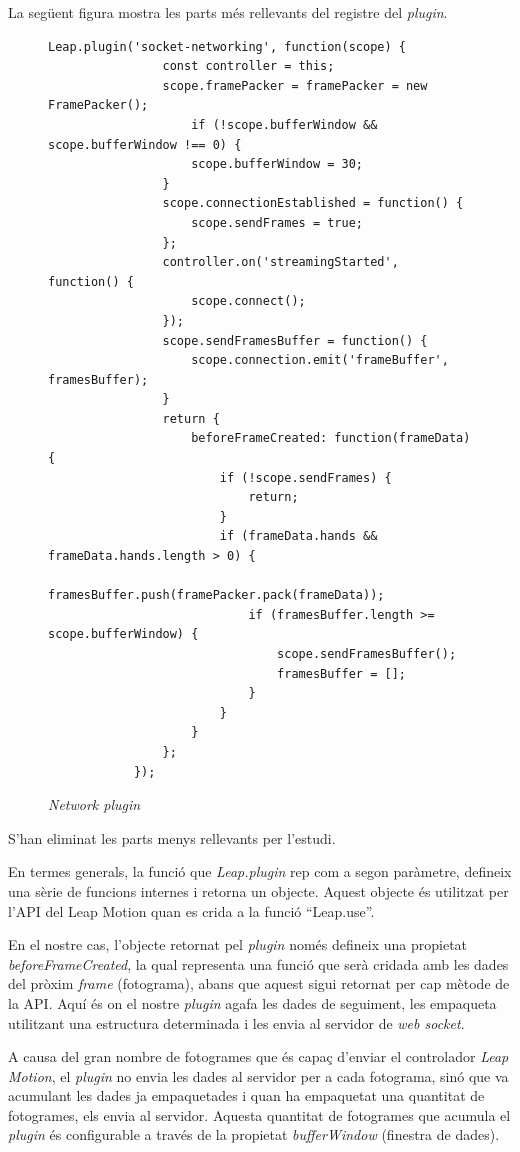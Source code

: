 \documentclass[12pt,a4paper,catalan]{article}
\begin{document}
	La següent figura mostra les parts més rellevants del registre del \textit{plugin}.
	\begin{figure}[H]
		\begin{lstlisting}[gobble=12, tabsize=4]
			Leap.plugin('socket-networking', function(scope) {
				const controller = this;
				scope.framePacker = framePacker = new FramePacker();
					if (!scope.bufferWindow && scope.bufferWindow !== 0) {
					scope.bufferWindow = 30;
				}
				scope.connectionEstablished = function() {
					scope.sendFrames = true;
				};
				controller.on('streamingStarted', function() {
					scope.connect();
				});
				scope.sendFramesBuffer = function() {
					scope.connection.emit('frameBuffer', framesBuffer);
				}
				return {
					beforeFrameCreated: function(frameData) {
						if (!scope.sendFrames) {
							return;
						}
						if (frameData.hands && frameData.hands.length > 0) {
							framesBuffer.push(framePacker.pack(frameData));
							if (framesBuffer.length >= scope.bufferWindow) {
								scope.sendFramesBuffer();
								framesBuffer = [];
							}
						}
					}
				};
			});
		\end{lstlisting}
		\caption{\textit{Network plugin}}
		\label{fig:network-plugin}
	\end{figure}
	S'han eliminat les parts menys rellevants per l'estudi.
	
	En termes generals, la funció que \textit{Leap.plugin} rep com a segon paràmetre, defineix una sèrie de funcions internes i retorna un objecte. Aquest objecte és utilitzat per l'API del Leap Motion quan es crida a la funció “Leap.use”.
	
	En el nostre cas, l'objecte retornat pel \textit{plugin} només defineix una propietat \textit{beforeFrameCreated}, la qual representa una funció que serà cridada amb les dades del pròxim \textit{frame} (fotograma), abans que aquest sigui retornat per cap mètode de la API.
	Aquí és on el nostre \textit{plugin} agafa les dades de seguiment, les empaqueta utilitzant una estructura determinada i les envia al servidor de \textit{web socket}.
	
	A causa del gran nombre de fotogrames que és capaç d'enviar el controlador \textit{Leap Motion}, el \textit{plugin} no envia les dades al servidor per a cada fotograma, sinó que va acumulant les dades ja empaquetades i quan ha empaquetat una quantitat de fotogrames, els envia al servidor. Aquesta quantitat de fotogrames que acumula el \textit{plugin} és configurable a través de la propietat \textit{bufferWindow} (finestra de dades).
	
\end{document}
